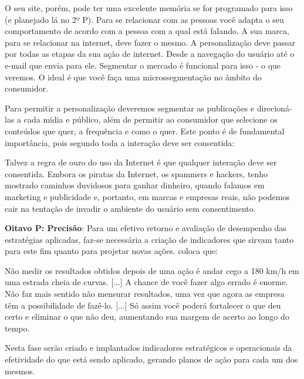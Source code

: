 \begin{citacao}
O seu site, porém, pode ter uma excelente memória se for programado para isso (e planejado lá no 2º P). Para se relacionar com as pessoas você adapta o seu comportamento de acordo com a pessoa com a qual está falando. A sua marca, para se relacionar na internet, deve fazer o mesmo. A personalização deve passar   por todas as etapas da sua ação de internet. Desde a navegação do usuário até o e-mail que  envia para ele. Segmentar o mercado é funcional para isso - o que veremos.  O ideal é que você faça uma microssegmentação no âmbito do consumidor.
\end{citacao}

Para permitir a personalização deveremos segmentar as publicações e direcioná-las a cada mídia e público, além de permitir ao consumidor que selecione os conteúdos que quer, a frequência e como o quer. Este ponto é de fundamental importância, pois segundo  toda a interação deve ser consentida:

\begin{citacao}
Talvez a regra de ouro do uso da Internet é que qualquer interação deve ser consentida. Embora os piratas da Internet, os spammers e hackers, tenho mostrado caminhos duvidosos para ganhar dinheiro, quando falamos em marketing e publicidade e, portanto, em marcas e empresas reais, não podemos cair na tentação de invadir o ambiente do usuário sem consentimento.
\end{citacao}

\textbf{Oitavo P: Precisão}: Para um efetivo retorno e avaliação de desempenho das estratégias aplicadas, faz-se necessária a criação de indicadores que sirvam tanto para este fim quanto para projetar novas ações.  coloca que:

\begin{citacao}
Não medir os resultados obtidos depois de uma ação é andar cego a 180 km/h em uma estrada cheia de curvas. [...] A chance de você fazer algo errado é enorme. Não faz mais sentido não mensurar resultados, uma vez que agora as empresa têm a possibilidade de fazê-lo. [...] Só assim você poderá fortalecer o que deu certo e eliminar o que não deu, aumentando sua margem de acerto ao longo do tempo.
\end{citacao}

Nesta fase serão criado e implantados indicadores estratégicos e operacionais da efetividade do que está sendo aplicado, gerando planos de ação para cada um dos mesmos.
